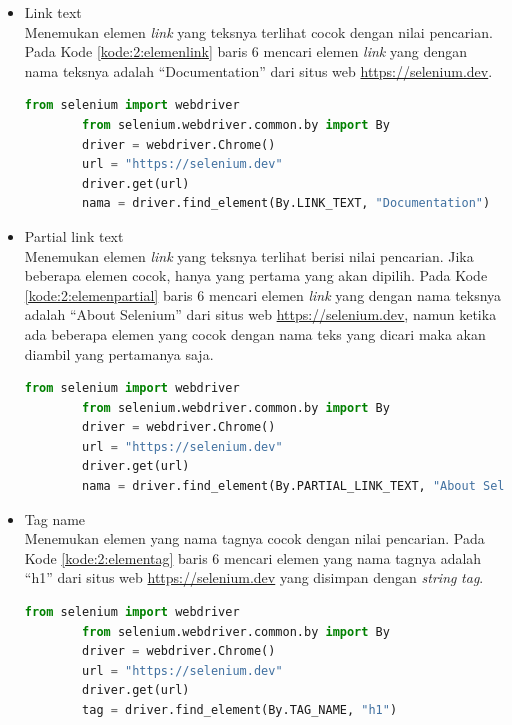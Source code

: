 \begin{itemize}
	\item Link text\\
	Menemukan elemen \textit{link} yang teksnya terlihat cocok dengan nilai pencarian. Pada Kode \ref{kode:2:elemenlink} baris 6 mencari elemen \textit{link} yang dengan nama teksnya adalah ``Documentation'' dari situs web \url{https://selenium.dev}.
	\begin{lstlisting}[language=python, caption=Contoh kode untuk menemukan elemen dengan \textit{link text}, label=kode:2:elemenlink]
		from selenium import webdriver
		from selenium.webdriver.common.by import By
		driver = webdriver.Chrome()
		url = "https://selenium.dev"
		driver.get(url)
		nama = driver.find_element(By.LINK_TEXT, "Documentation")
	\end{lstlisting}
	
	\item Partial link text\\
	Menemukan elemen \textit{link} yang teksnya terlihat berisi nilai pencarian. Jika beberapa elemen cocok, hanya yang pertama yang akan dipilih. Pada Kode \ref{kode:2:elemenpartial} baris 6 mencari elemen \textit{link} yang dengan nama teksnya adalah ``About Selenium'' dari situs web \url{https://selenium.dev}, namun ketika ada beberapa elemen yang cocok dengan nama teks yang dicari maka akan diambil yang pertamanya saja.
	\begin{lstlisting}[language=python, caption=Contoh kode untuk menemukan elemen dengan \textit{partial link text}, label=kode:2:elemenpartial]
		from selenium import webdriver
		from selenium.webdriver.common.by import By
		driver = webdriver.Chrome()
		url = "https://selenium.dev"
		driver.get(url)
		nama = driver.find_element(By.PARTIAL_LINK_TEXT, "About Selenium")
	\end{lstlisting}
	
	\item Tag name\\
	Menemukan elemen yang nama tagnya cocok dengan nilai pencarian. Pada Kode \ref{kode:2:elementag} baris 6 mencari elemen yang nama tagnya adalah ``h1'' dari situs web \url{https://selenium.dev} yang disimpan dengan \textit{string} \textit{tag}.
	\begin{lstlisting}[language=python, caption=Contoh kode untuk menemukan elemen dengan \textit{tag name}, label=kode:2:elementag]
		from selenium import webdriver
		from selenium.webdriver.common.by import By
		driver = webdriver.Chrome()
		url = "https://selenium.dev"
		driver.get(url)
		tag = driver.find_element(By.TAG_NAME, "h1")
	\end{lstlisting}
	

\end{itemize}
